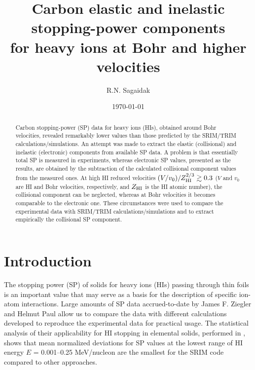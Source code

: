 \documentclass[aps,pra,twocolumn,amsmath,amssymb,floatfix]{revtex4-2}
\begin{document}
\newcommand{\ea}{{\it et al.}}


\title{Carbon elastic and inelastic stopping-power components \\
 for heavy ions at Bohr and higher velocities}

\author{R.N. Sagaidak}

\date{\today}

\begin{abstract}
Carbon stopping-power (SP) data for heavy ions (HIs), obtained around Bohr velocities, revealed remarkably lower values than those predicted by the SRIM/TRIM calculations/simulations. An attempt was made to extract the elastic (collisional) and inelastic (electronic) components from available SP data. A problem is that essentially total SP is  measured in experiments, whereas electronic SP values, presented as the results, are obtained by the subtraction of the calculated collisional component values from the measured ones. At high HI reduced velocities $(V/v_{0})/Z^{2/3}_{\rm HI} \gtrsim 0.3$ ($V$ and $v_{0}$ are HI and Bohr velocities, respectively, and $Z_{\rm HI}$ is the HI atomic number), the collisional component can be neglected, whereas at Bohr velocities it becomes comparable to the electronic one. These circumstances were used to compare  the experimental data with SRIM/TRIM calculations/simulations and to extract empirically the collisional SP component.
\end{abstract}
\maketitle


\section{\label{Intromotiv}Introduction}

The stopping power (SP) of solids for heavy ions (HIs) passing through thin foils is an important value that may serve as a basis for the description of specific ion-atom interactions. Large amounts of SP data accrued-to-date by James F. Ziegler \cite{SRIM} and Helmut Paul \cite{IAEASP} allow us to compare the data with different calculations developed to reproduce the experimental data for practical usage. The statistical analysis of their applicability for HI stopping in elemental solids, performed in \cite{IAEASP,Paul2003,Paul2010,Paul2013}, shows that mean normalized deviations for SP values at the lowest range of HI energy $E$ = 0.001--0.25 MeV/nucleon are the smallest for the SRIM code \cite{SRIM} compared to other approaches.
\end{document}
